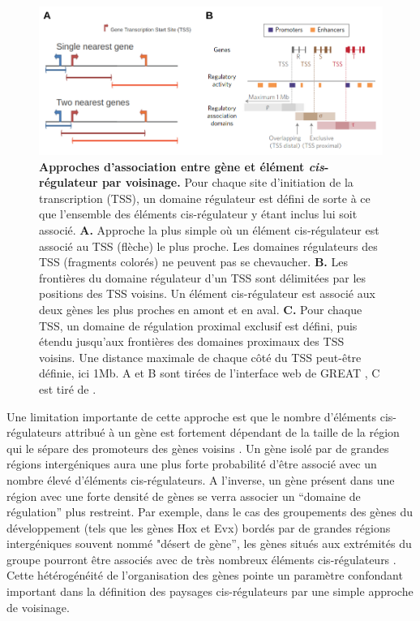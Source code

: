 \begin{figure}[h]
    \centering
    \includegraphics[width=1\textwidth, page=1]{figures/chap2/chap2-fig1.png}
    \caption[Approches d'association entre gène et élément \textit{cis}-régulateur par voisinage.]{
    \textbf{Approches d'association entre gène et élément \textit{cis}-régulateur par voisinage.}
    Pour chaque site d'initiation de la transcription (\acrshort{TSS}), un domaine régulateur est défini de sorte à ce que l'ensemble des éléments \gls{cis}-régulateur y étant inclus lui soit associé.
    \textbf{A.} Approche la plus simple où un élément \gls{cis}-régulateur est associé au \acrshort{TSS} (flèche) le plus proche. Les domaines régulateurs des \acrshort{TSS} (fragments colorés) ne peuvent pas se chevaucher.
    \textbf{B.} Les frontières du domaine régulateur d'un \acrshort{TSS} sont délimitées par les positions des \acrshort{TSS} voisins. Un élément \gls{cis}-régulateur est associé aux deux gènes les plus proches en amont et en aval.
    \textbf{C.} Pour chaque \acrshort{TSS}, un domaine de régulation proximal exclusif est défini, puis étendu jusqu'aux frontières des domaines proximaux des \acrshort{TSS} voisins. Une distance maximale de chaque côté du \acrshort{TSS} peut-être définie, ici 1Mb. A et B sont tirées de l'interface web de GREAT \citep{mclean_great_2010}, C est tiré de \citep{berthelot_complexity_2018}.  \\
    }
    \label{fig:chap2-fig1}
\end{figure} 

Une limitation importante de cette approche est que le nombre d’éléments \gls{cis}-régulateurs attribué à un gène est fortement dépendant de la taille de la région qui le sépare des promoteurs des gènes voisins \citep{taher_variable_2009}. Un gène isolé par de grandes régions intergéniques aura une plus forte probabilité d’être associé avec un nombre élevé d’éléments \gls{cis}-régulateurs. A l’inverse, un gène présent dans une région avec une forte densité de gènes se verra associer un “domaine de régulation” plus restreint. Par exemple, dans le cas des groupements des gènes du développement (tels que les gènes Hox et Evx) bordés par de grandes régions intergéniques souvent nommé "désert de gène”, les gènes situés aux extrémités du groupe pourront être associés avec de très nombreux éléments \gls{cis}-régulateurs \citep{taher_variable_2009}. Cette hétérogénéité de l’organisation des gènes pointe un paramètre confondant important dans la définition des paysages \gls{cis}-régulateurs par une simple approche de voisinage.

